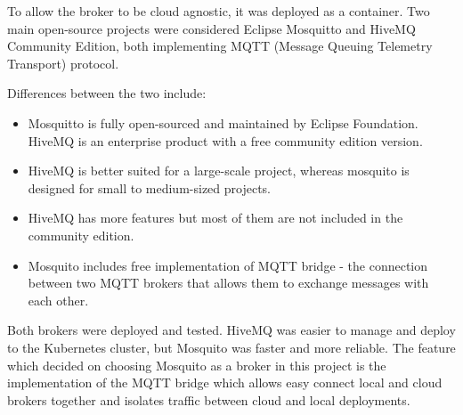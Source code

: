 To allow the broker to be cloud agnostic, it was deployed as a container. Two main open-source projects were considered Eclipse Mosquitto and HiveMQ Community Edition, both implementing MQTT (Message Queuing Telemetry Transport) protocol.

Differences between the two include:

\begin{itemize}
    \item Mosquitto is fully open-sourced and maintained by Eclipse Foundation. HiveMQ is an enterprise product with a free community edition version.
    \item HiveMQ is better suited for a large-scale project, whereas mosquito is designed for small to medium-sized projects.
    \item HiveMQ has more features but most of them are not included in the community edition.
    \item Mosquito includes free implementation of MQTT bridge - the connection between two MQTT brokers that allows them to exchange messages with each other.
\end{itemize}

Both brokers were deployed and tested. HiveMQ was easier to manage and deploy to the Kubernetes cluster, but Mosquito was faster and more reliable. The feature which decided on choosing Mosquito as a broker in this project is the implementation of the MQTT bridge which allows easy connect local and cloud brokers together and isolates traffic between cloud and local deployments.